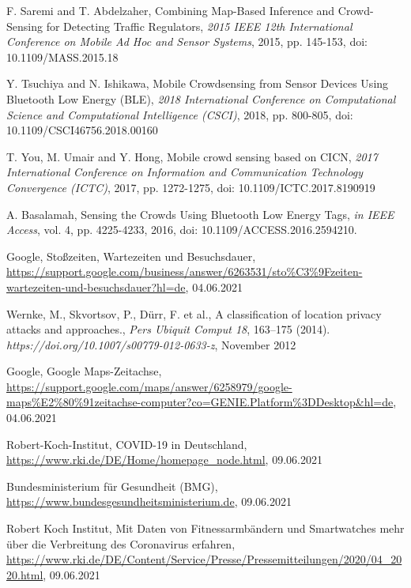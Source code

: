 \documentclass[conference,compsoc]{IEEEtran}
\begin{document}
\begin{thebibliography}{00}
 F. Saremi and T. Abdelzaher, \glqq Combining Map-Based Inference and Crowd-Sensing for Detecting Traffic Regulators\grqq, \textit{2015 IEEE 12th International Conference on Mobile Ad Hoc and Sensor Systems}, 2015, pp. 145-153, doi: 10.1109/MASS.2015.18

 Y. Tsuchiya and N. Ishikawa, \glqq Mobile Crowdsensing from Sensor Devices Using Bluetooth Low Energy (BLE)\grqq,\textit{ 2018 International Conference on Computational Science and Computational Intelligence (CSCI)}, 2018, pp. 800-805, doi: 10.1109/CSCI46756.2018.00160

 T. You, M. Umair and Y. Hong, \glqq Mobile crowd sensing based on CICN\grqq, \textit{2017 International Conference on Information and Communication Technology Convergence (ICTC)}, 2017, pp. 1272-1275, doi: 10.1109/ICTC.2017.8190919

 A. Basalamah, \glqq Sensing the Crowds Using Bluetooth Low Energy Tags\grqq, \textit{in IEEE Access}, vol. 4, pp. 4225-4233, 2016, doi: 10.1109/ACCESS.2016.2594210.

 Google, \glqq Stoßzeiten, Wartezeiten und Besuchsdauer\grqq, \url{https://support.google.com/business/answer/6263531/sto%C3%9Fzeiten-wartezeiten-und-besuchsdauer?hl=de}, 04.06.2021

 Wernke, M., Skvortsov, P., Dürr, F. et al., \glqq A classification of location privacy attacks and approaches.\grqq, \textit{Pers Ubiquit Comput 18}, 163–175 (2014).\textit{ https://doi.org/10.1007/s00779-012-0633-z}, November 2012

 Google, \glqq Google Maps-Zeitachse\grqq, \\ \url{https://support.google.com/maps/answer/6258979/google-maps\%E2\%80\%91zeitachse-computer?co=GENIE.Platform\%3DDesktop&hl=de}, 04.06.2021

 Robert-Koch-Institut, \glqq COVID-19 in Deutschland\grqq,\\ \url{https://www.rki.de/DE/Home/homepage_node.html}, 09.06.2021

 Bundesministerium für Gesundheit (BMG),\\ \url{https://www.bundesgesundheitsministerium.de}, 09.06.2021

 Robert Koch Institut, \glqq Mit Daten von Fitnessarmbändern und Smartwatches mehr über die Verbreitung des Coronavirus erfahren\grqq,\\ \url{https://www.rki.de/DE/Content/Service/Presse/Pressemitteilungen/2020/04_2020.html}, 09.06.2021


\end{thebibliography}
\end{document}
